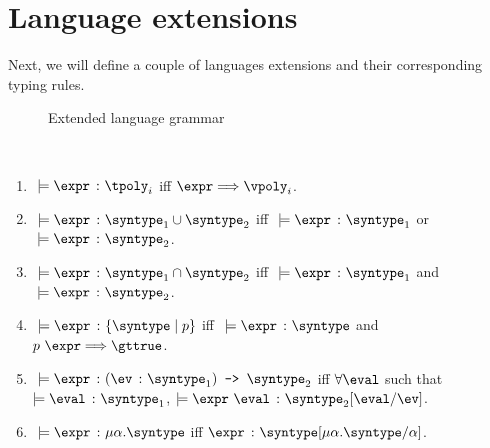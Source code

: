 \section{Language extensions}

Next, we will define a couple of languages extensions and their corresponding typing rules.

\begin{figure}[hbt!]%
  \begin{grammar}
            \grule[expressions]{\expr}{
              \cdots
              \gor \vpoly
            }
            \grule[values]{\eval}{
              \cdots
              \gor \vpoly
            }
            \grule[types]{\syntype}{
              \cdots
              \gor \tpoly
              \gor \mkunion{\syntype}{\syntype}
              \gor \mkintersect{\syntype}{\syntype}
              \gor \mktset{\syntype}{\expr}
              \gor \mkdfun{\ev}{\syntype}{\syntype}
              \gor \mkmiu{\alpha}{\syntype}
          }
        \end{grammar}
    \caption{Extended language grammar}
    \label{ext_Grammar}
\end{figure}

\begin{definition}
  \label{def_typingRulesExt}
  \ \par
  \begin{enumerate}
      \item $\ \models \hastype{\expr}{\tpoly_i}$ iff $\expr \bigstep \vpoly_i$.
      \item $\ \models \hastype{\expr}{\mkunion{\syntype_1}{\syntype_2}}$ iff $\ \models \hastype{\expr}{\syntype_1}$ or $\ \models \hastype{\expr}{\syntype_2}$.
      \item $\ \models \hastype{\expr}{\mkintersect{\syntype_1}{\syntype_2}}$ iff $\ \models \hastype{\expr}{\syntype_1}$ and $\ \models \hastype{\expr}{\syntype_2}$.
      \item $\ \models \hastype{\expr}{\mktset{\syntype}{p}}$ iff $\ \models \hastype{\expr}{\syntype}$ and $p \ \expr \Longrightarrow \gttrue$.
      \item $\ \models \hastype{\expr}{\mkdfun{\ev}{\syntype_1}{\syntype_2}}$ iff $\forall{\eval}$ such that $\models \hastype{\eval}{\syntype_1}$, $\models \hastype{\expr\ \eval}{\substitute{\syntype_2}{\eval}{\ev}}$.
      \item $\ \models \hastype{\expr}{\mkmiu{\alpha}{\syntype}}$ iff $\hastype{\expr}{\substitute{\syntype}{\mkmiu{\alpha}{\syntype}}{\alpha}}$.
  \end{enumerate}
\end{definition}

